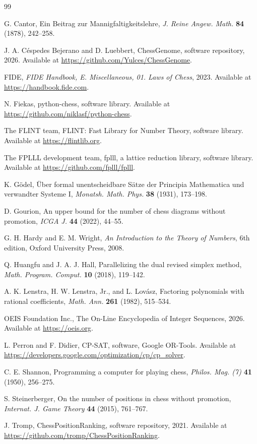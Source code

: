 \documentclass[12pt,reqno]{article}
\begin{document}
\begin{thebibliography}{99}

G. Cantor, Ein Beitrag zur Mannigfaltigkeitslehre, \emph{J. Reine Angew. Math.} \textbf{84}
(1878), 242--258.

J. A. C\'espedes Bejerano and D. Luebbert, ChessGenome, software repository, 2026. Available at
\url{https://github.com/Yulces/ChessGenome}.

FIDE, \emph{FIDE Handbook, E. Miscellaneous, 01. Laws of Chess}, 2023. Available at
\url{https://handbook.fide.com}.

N. Fiekas, python-chess, software library. Available at
\url{https://github.com/niklasf/python-chess}.

The FLINT team, FLINT: Fast Library for Number Theory, software library. Available at
\url{https://flintlib.org}.

The FPLLL development team, fplll, a lattice reduction library, software library. Available at
\url{https://github.com/fplll/fplll}.

K. G\"odel, \"Uber formal unentscheidbare S\"atze der Principia Mathematica und verwandter
Systeme I, \emph{Monatsh. Math. Phys.} \textbf{38} (1931), 173--198.

D. Gourion, An upper bound for the number of chess diagrams without promotion, \emph{ICGA J.}
\textbf{44} (2022), 44--55.

G. H. Hardy and E. M. Wright, \emph{An Introduction to the Theory of Numbers}, 6th edition,
Oxford University Press, 2008.

Q. Huangfu and J. A. J. Hall, Parallelizing the dual revised simplex method, \emph{Math.
Program. Comput.} \textbf{10} (2018), 119--142.

A. K. Lenstra, H. W. Lenstra, Jr., and L. Lov\'asz, Factoring polynomials with rational
coefficients, \emph{Math. Ann.} \textbf{261} (1982), 515--534.

OEIS Foundation Inc., The On-Line Encyclopedia of Integer Sequences, 2026. Available at
\url{https://oeis.org}.

L. Perron and F. Didier, CP-SAT, software, Google OR-Tools. Available at
\url{https://developers.google.com/optimization/cp/cp_solver}.

C. E. Shannon, Programming a computer for playing chess, \emph{Philos. Mag. (7)} \textbf{41}
(1950), 256--275.

S. Steinerberger, On the number of positions in chess without promotion, \emph{Internat. J.
Game Theory} \textbf{44} (2015), 761--767.

J. Tromp, ChessPositionRanking, software repository, 2021. Available at
\url{https://github.com/tromp/ChessPositionRanking}.

\end{thebibliography}
\end{document}
